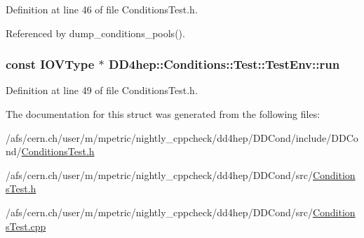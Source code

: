 Definition at line 46 of file ConditionsTest.h.

Referenced by dump\_\-conditions\_\-pools().\hypertarget{struct_d_d4hep_1_1_conditions_1_1_test_1_1_test_env_adf17ffc8d010573be87030ddc963d947}{
\subsubsection[{run}]{\setlength{\rightskip}{0pt plus 5cm}const {\bf IOVType} $\ast$ {\bf DD4hep::Conditions::Test::TestEnv::run}}}
\label{struct_d_d4hep_1_1_conditions_1_1_test_1_1_test_env_adf17ffc8d010573be87030ddc963d947}


Definition at line 49 of file ConditionsTest.h.

The documentation for this struct was generated from the following files:\begin{DoxyCompactItemize}
\item 
/afs/cern.ch/user/m/mpetric/nightly\_\-cppcheck/dd4hep/DDCond/include/DDCond/\hyperlink{include_2_d_d_cond_2_conditions_test_8h}{ConditionsTest.h}\item 
/afs/cern.ch/user/m/mpetric/nightly\_\-cppcheck/dd4hep/DDCond/src/\hyperlink{src_2_conditions_test_8h}{ConditionsTest.h}\item 
/afs/cern.ch/user/m/mpetric/nightly\_\-cppcheck/dd4hep/DDCond/src/\hyperlink{_conditions_test_8cpp}{ConditionsTest.cpp}\end{DoxyCompactItemize}
